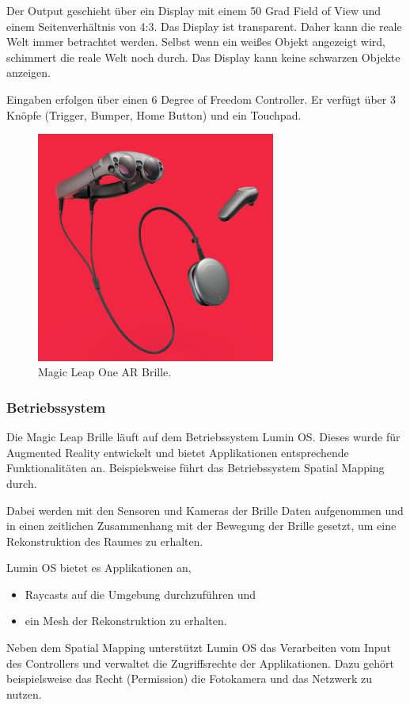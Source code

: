 Der Output geschieht über ein Display mit einem 50 Grad Field of View und einem Seitenverhältnis von 4:3. Das Display ist transparent. Daher kann die reale Welt immer betrachtet werden. Selbst wenn ein weißes Objekt angezeigt wird, schimmert die reale Welt noch durch. 
Das Display kann keine schwarzen Objekte anzeigen. 

Eingaben erfolgen über einen 6 Degree of Freedom Controller. Er verfügt über 3 Knöpfe (Trigger, Bumper, Home Button) und ein Touchpad. \citep{mlofficialsalespitch,mlglossary}

\begin{figure}[H]
	\centering
	\includegraphics[width=0.7\textwidth]{images/img_magicLeap.PNG}
	\caption[Magic Leap One AR Brille.\citep{mlImage}]{Magic Leap One AR Brille.\citep{mlImage}}
	\label{magcileap}
\end{figure}

\subsubsection{Betriebssystem}
Die Magic Leap Brille läuft auf dem Betriebssystem Lumin OS. Dieses wurde für Augmented Reality entwickelt und bietet Applikationen entsprechende Funktionalitäten an. Beispielsweise führt das Betriebssystem Spatial Mapping durch.\citep{mlluminOS,mlluminfeatures}

Dabei werden mit den Sensoren und Kameras der Brille Daten aufgenommen und in einen zeitlichen Zusammenhang mit der Bewegung der Brille gesetzt, um eine Rekonstruktion des Raumes zu erhalten.\citep{mlluminOS,mlluminfeatures,mlluminworldreconstruktion,mlmeshingunity}

Lumin OS bietet es Applikationen an,
\begin{itemize}
	\item Raycasts auf die Umgebung durchzuführen und
	\item ein Mesh der Rekonstruktion zu erhalten.
\end{itemize}
Neben dem Spatial Mapping unterstützt Lumin OS das Verarbeiten vom Input des Controllers und verwaltet die Zugriffsrechte der Applikationen. Dazu gehört beispielsweise das Recht (Permission) die Fotokamera und das Netzwerk zu nutzen.\citep{mlluminfeatures,mlappsecurity}

